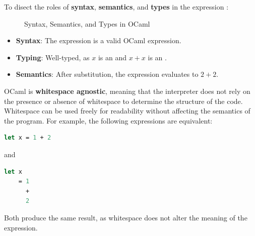 \vspace{-1em}
\noindent
To disect the roles of \textbf{syntax}, \textbf{semantics}, and \textbf{types} in the expression :

\begin{figure}[h]
    {
        \setlength{\fboxsep}{10pt}
    \centering
    }
    \caption{Syntax, Semantics, and Types in OCaml}
    \label{fig:ocaml-in2}
\end{figure}

\vspace{-1em}
\noindent
\begin{itemize}
    \item \textbf{Syntax}: The expression  is a valid OCaml expression.
    \item \textbf{Typing}: Well-typed, as $x$ is an  and $x + x$ is an .
    \item \textbf{Semantics}: After substitution, the expression evaluates to $2 + 2$.
\end{itemize}

\newpage 

\begin{Def}
    OCaml is \textbf{whitespace agnostic}, meaning that the interpreter does not rely on the presence or absence of whitespace to determine the structure of the code. Whitespace can be used freely for readability without affecting the semantics of the program. For example, the following expressions are equivalent:
    \begin{lstlisting}[language=OCaml, numbers=none, caption={Whitespace Agnostic Example}]
    let x = 1 + 2
    \end{lstlisting}

    and

    \begin{lstlisting}[language=OCaml, numbers=none]
    let x 
    = 1
      +
      2
    \end{lstlisting}

    \noindent
    Both produce the same result, as whitespace does not alter the meaning of the expression.
\end{Def}

